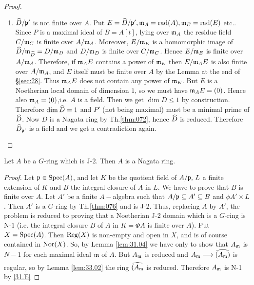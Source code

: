 \documentclass[../main]{subfiles}
\begin{document}
\begin{proof}
\begin{enumerate}[label = Case \arabic*.]
    \item $\widehat{D} / \mathfrak{p}'$ is not finite over $A$. Put $E=\widehat{D} / \mathfrak{p}',\mathfrak{m}_A=\operatorname{rad}(A), \mathfrak{m}_E=\operatorname{rad}(E)$ etc.. Since $P$ is a maximal ideal of $B=A[t]$, lying over $\mathfrak{m}_A$ the residue field $C / \mathfrak{m}_C$ is finite over $A / \mathfrak{m}_A$. Moreover, $E / \mathfrak{m}_E$ is a homomorphic image of $\widehat{D} / \mathfrak{m}_{\widehat{D}}=D / \mathfrak{m}_D$ and $D / \mathfrak{m}_D$ is finite over $C / \mathfrak{m}_C$. Hence $E / \mathfrak{m}_E$ is finite over $A / \mathfrak{m}_A$. Therefore, if $\mathfrak{m}_A E$ contains a power of $\mathfrak{m}_E$ then $E / \mathfrak{m}_A E$ is also finite over $A / \mathfrak{m}_A$, and $E$ itself must be finite over $A$ by the Lemma at the end of \S\ref{sec:28}. Thus $\mathfrak{m}_A E$ does not contain any power of $\mathfrak{m}_E$. But $E$ is a Noetherian local domain of dimension $1$, so we must have $\mathfrak{m}_A E=(0)$. Hence also $\mathfrak{m}_A=(0)$,i.e. $A$ is a field. Then we get $\dim D \leqslant 1$ by construction. Therefore $\operatorname{dim}\widehat{D}=1$ and $P'$ (not being maximal) must be a minimal prime of $\widehat{D}$. Now $D$ is a Nagata ring by Th.\ref{thm:072}, hence $\widehat{D}$ is reduced. Therefore $\widehat{D}_{\mathfrak{p}'}$ is a field and we get a contradiction again.
\end{enumerate}
\end{proof}

\begin{partheorem}\label{thm:078} Let $A$ be a $G$-ring which is J-2. Then $A$ is a Nagata ring.\end{partheorem}

\begin{proof} Let $\mathfrak{p} \in \operatorname{Spec}(A)$, and let $K$ be the quotient field of $A / \mathfrak{p},\, L$ a finite extension of $K$ and $B$ the integral closure of $A$ in $L$. We have to prove that $B$ is finite over $A$. Let $A'$ be a finite $A-$algebra such that $A / \mathfrak{p}\subseteq A' \subseteq B$ and $\phi A' \times L$. Then $A'$ is a $G$-ring by Th.\ref{thm:076} and is J-2. Thus, replacing $A$ by $A'$, the problem is reduced to proving that a Noetherian J-2 domain which is a $G$-ring is N-1 (i.e. the integral closure $B$ of $A$ in $K=\Phi A$ is finite over $A$). Put $X=\operatorname{Spec}(A)$. Then $\operatorname{Reg}(X)$ is non-empty and open in $X$, and is of course contained in $\operatorname{Nor}(X)$. So, by Lemma \ref{lem:31.04} we have only to show that $A_{\mathfrak{m}}$ is $N-1$ for each maximal ideal $\mathfrak{m}$ of $A$. But $A_{\mathfrak{m}}$ is reduced and $A_{\ideal{m}} \varrightarrow{}\completion{(A_{\ideal{m}})}$ is regular, so by Lemma \ref{lem:33.02} the ring $\widehat{(A_{\mathfrak{m}}}$ is reduced. Therefore $A_{\mathfrak{m}}$ is N-1 by \ref{31.E}\end{proof}
\end{document}
